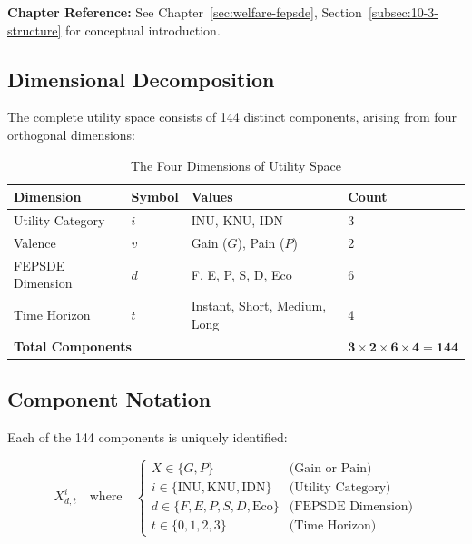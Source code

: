 \begin{cross-reference}
\textbf{Chapter Reference:} See Chapter~\ref{sec:welfare-fepsde}, 
Section~\ref{subsec:10-3-structure} for conceptual introduction.
\end{cross-reference}

\subsection{Dimensional Decomposition}

The complete utility space consists of 144 distinct components, arising from 
four orthogonal dimensions:

\begin{table}[htbp]
\centering
\caption{The Four Dimensions of Utility Space}
\label{tab:app-c-dimensions}
\renewcommand{\arraystretch}{1.4}
\begin{tabular}{@{}llll@{}}
\toprule
\textbf{Dimension} & \textbf{Symbol} & \textbf{Values} & \textbf{Count} \\
\midrule
Utility Category & $i$ & INU, KNU, IDN & 3 \\
Valence & $v$ & Gain ($G$), Pain ($P$) & 2 \\
FEPSDE Dimension & $d$ & F, E, P, S, D, Eco & 6 \\
Time Horizon & $t$ & Instant, Short, Medium, Long & 4 \\
\midrule
\multicolumn{3}{l}{\textbf{Total Components}} & $\mathbf{3 \times 2 \times 6 \times 4 = 144}$ \\
\bottomrule
\end{tabular}
\end{table}

\subsection{Component Notation}

Each of the 144 components is uniquely identified:

\begin{equation}
X^i_{d,t} \quad \text{where} \quad 
\begin{cases}
X \in \{G, P\} & \text{(Gain or Pain)} \\
i \in \{\text{INU}, \text{KNU}, \text{IDN}\} & \text{(Utility Category)} \\
d \in \{F, E, P, S, D, \text{Eco}\} & \text{(FEPSDE Dimension)} \\
t \in \{0, 1, 2, 3\} & \text{(Time Horizon)}
\end{cases}
\end{equation}

